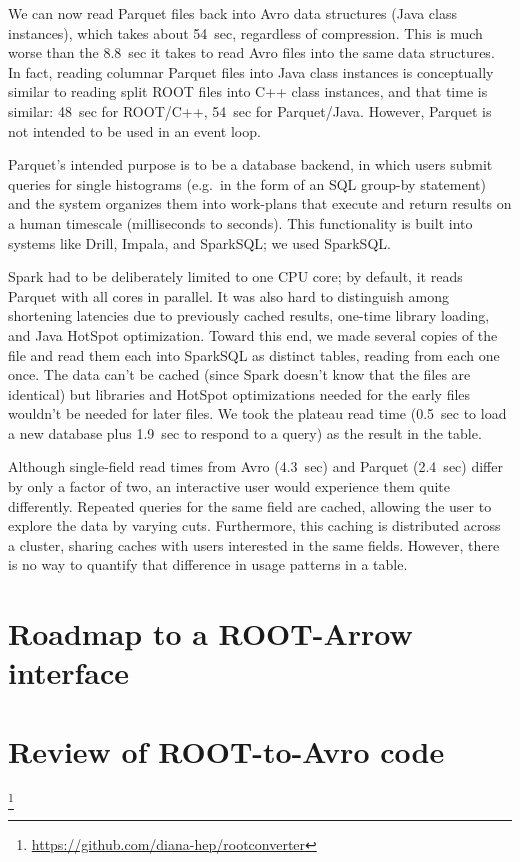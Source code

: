 \documentclass{article}
\begin{document}
We can now read Parquet files back into Avro data structures (Java class instances), which takes about 54~sec, regardless of compression. This is much worse than the 8.8~sec it takes to read Avro files into the same data structures. In fact, reading columnar Parquet files into Java class instances is conceptually similar to reading split ROOT files into C++ class instances, and that time is similar: 48~sec for ROOT/C++, 54~sec for Parquet/Java. However, Parquet is not intended to be used in an event loop.

Parquet's intended purpose is to be a database backend, in which users submit queries for single histograms (e.g.\ in the form of an SQL group-by statement) and the system organizes them into work-plans that execute and return results on a human timescale (milliseconds to seconds). This functionality is built into systems like Drill, Impala, and SparkSQL; we used SparkSQL.

Spark had to be deliberately limited to one CPU core; by default, it reads Parquet with all cores in parallel. It was also hard to distinguish among shortening latencies due to previously cached results, one-time library loading, and Java HotSpot optimization. Toward this end, we made several copies of the file and read them each into SparkSQL as distinct tables, reading from each one once. The data can't be cached (since Spark doesn't know that the files are identical) but libraries and HotSpot optimizations needed for the early files wouldn't be needed for later files. We took the plateau read time (0.5~sec to load a new database plus 1.9~sec to respond to a query) as the result in the table.

Although single-field read times from Avro (4.3~sec) and Parquet (2.4~sec) differ by only a factor of two, an interactive user would experience them quite differently. Repeated queries for the same field are cached, allowing the user to explore the data by varying cuts. Furthermore, this caching is distributed across a cluster, sharing caches with users interested in the same fields. However, there is no way to quantify that difference in usage patterns in a table.

\section*{Roadmap to a ROOT-Arrow interface}




\section*{Review of ROOT-to-Avro code}

\footnote{\url{https://github.com/diana-hep/rootconverter}}
\end{document}
